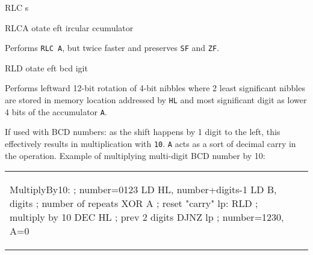 \begin{basedescript}{
	\desclabelstyle{\multilinelabel}
	\desclabelwidth{3cm}}
\begin{DetailItem}{RLC s}
\begin{multicols}{2}
		\end{multicols}

		\begin{DetailEffects}[p]
			\FlagsRLCr
		\end{DetailEffects}
						
		\begin{DetailTiming}
		\end{DetailTiming}

	\end{DetailItem}

	\pagebreak
	\begin{DetailItem}{RLCA}
		{otate eft ircular ccumulator}
		{\SymRLC{A}}
		
		Performs {\tt RLC A}, but twice faster and preserves {\tt SF} and {\tt ZF}.

		\begin{DetailEffects}
			\FlagsRLCA
		\end{DetailEffects}
						
		\begin{DetailTiming}
			\DetailTime{1}{4}
		\end{DetailTiming}

	\end{DetailItem}

	\label{DetailRefRLD}
	\begin{DetailItem}{RLD}
		{otate eft bcd igit}
		{\SymRLD}

		Performs leftward 12-bit rotation of 4-bit nibbles where 2 least significant nibbles are stored in memory location addressed by {\tt HL} and most significant digit as lower 4 bits of the accumulator {\tt A}.
        
		If used with BCD numbers: as the shift happens by 1 digit to the left, this effectively results in multiplication with {\tt 10}. {\tt A} acts as a sort of decimal carry in the operation. Example of multiplying multi-digit BCD number by 10:

		\begin{tabular}{m{8cm}p{0.1cm}m{4.3cm}}

			{ %
			\begin{tcblisting}{}
MultiplyBy10:		; number=0123
	LD HL, number+digits-1
	LD B, digits	; number of repeats
	XOR A			; reset "carry"
lp:	RLD				; multiply by 10 
	DEC HL			; prev 2 digits
	DJNZ lp			; number=1230, A=0


\end{tcblisting}}
\end{tabular}
\end{DetailItem}
\end{basedescript}
